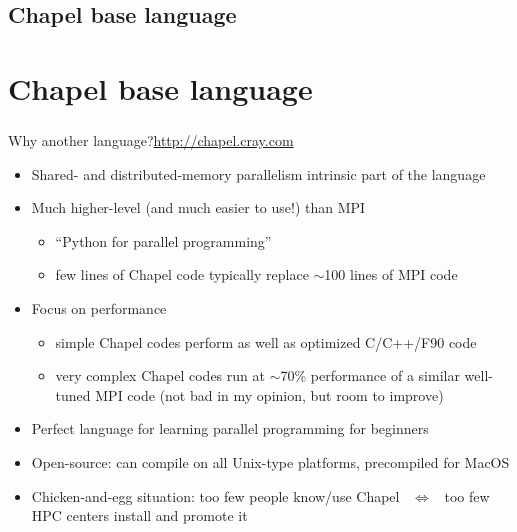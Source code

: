 
\section{Chapel base language}
\chapter{Chapel base language}
\subsection{} %

\begin{frame}{Why another language?}{\url{http://chapel.cray.com}}
  \begin{itemize}\setlength{\itemsep}{1mm}
    \item Shared- and distributed-memory parallelism intrinsic part of the language
    \item Much higher-level (and much easier to use!) than MPI
    \medskip
    \begin{itemize}\setlength{\itemsep}{1mm}
      \item ``Python for parallel programming''
      \item few lines of Chapel code typically replace $\sim$100 lines of MPI code
    \end{itemize}    
    \item Focus on performance
    \medskip
    \begin{itemize}\setlength{\itemsep}{1mm}
      \item simple Chapel codes perform as well as optimized C/C++/F90 code
      \item very complex Chapel codes run at $\sim$70\% performance of a similar well-tuned MPI code (not
      bad in my opinion, but room to improve)
    \end{itemize}    
    \item Perfect language for learning parallel programming for beginners
    \item Open-source: can compile on all Unix-type platforms, precompiled for MacOS
    \item Chicken-and-egg situation: too few people know/use Chapel ~$\Longleftrightarrow$~ too few HPC
    centers install and promote it
  \end{itemize}
\end{frame}

